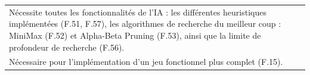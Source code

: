 \documentclass[a4paper,12pt]{article}
\begin{document}
\begin{tabularx}{\textwidth}{|X|}
    \arrayrulecolor{MediumAquamarine}\hline
    \arrayrulecolor{CornflowerBlue}
    Nécessite toutes les fonctionnalités de l’IA : les différentes heuristiques implémentées (F.51, F.57), les algorithmes de recherche du meilleur coup : MiniMax (F.52) et Alpha-Beta Pruning (F.53), ainsi que la limite de profondeur de recherche (F.56).                            \\
    Nécessaire pour l’implémentation d’un jeu fonctionnel plus complet (F.15).                                                                                                                                                                                                            \\
    \hline
\end{tabularx}

\vspace{1cm}
\end{document}
